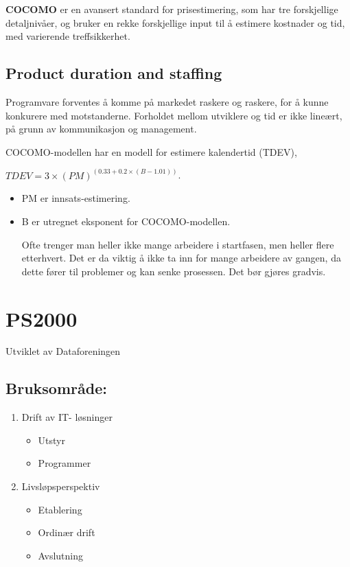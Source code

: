 \documentclass[11pt]{article}
\begin{document}
   \textbf{COCOMO} er en avansert standard for prisestimering, som har tre forskjellige detaljnivåer,
   og bruker en rekke forskjellige input til å estimere kostnader og tid, med varierende treffsikkerhet. 
\subsection{Product duration and staffing}
\label{sec-10.4}

   Programvare forventes å komme på markedet raskere og raskere, for å kunne konkurere med motstanderne. 
   Forholdet mellom utviklere og tid er ikke lineært, på grunn av kommunikasjon og management.

   COCOMO-modellen har en modell for estimere kalendertid (TDEV), 
   
   $TDEV = 3 \times (PM)^{(0.33+0.2 \times (B-1.01))}$.
   
\begin{itemize}
\item PM er innsats-estimering.
\item B er utregnet eksponent for COCOMO-modellen.

     Ofte trenger man heller ikke mange arbeidere i startfasen, men heller flere etterhvert. 
     Det er da viktig å ikke ta inn for mange arbeidere av gangen, da dette fører til problemer
     og kan senke prosessen. Det bør gjøres gradvis.
\end{itemize}
\section{PS2000}
\label{sec-11}

  Utviklet av Dataforeningen
\subsection{Bruksområde:}
\label{sec-11.1}

\begin{enumerate}
\item Drift av IT- løsninger

\begin{itemize}
\item Utstyr
\item Programmer
\end{itemize}

\item Livsløpsperspektiv

\begin{itemize}
\item Etablering
\item Ordinær drift
\item Avslutning
\end{itemize}

\end{enumerate}
\end{document}
